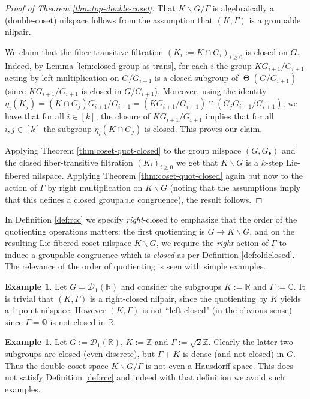 \documentclass[a4paper,12pt,reqno]{amsart}
\theoremstyle{definition}
\newtheorem{example}[theorem]{Example}
\def\to{\rightarrow}
\newcommand{\mc}{\mathcal}
\newcommand{\mb}{\mathbb}
\DeclareMathOperator{\tran}{\Theta}
\begin{document}
\begin{proof}[Proof of Theorem \ref{thm:top-double-coset}]
That $K\backslash G/{\Gamma}$ is algebraically a (double-coset) nilspace follows from the assumption that $(K,\Gamma)$ is a groupable nilpair.

We claim that the fiber-transitive filtration $(K_i:=K\cap G_i)_{i\geq 0}$ is closed on $ G$. Indeed, by Lemma \ref{lem:closed-group-as-trans}, for each $i$ the group 
$KG_{i+1}/G_{i+1}$ acting by left-multiplication on $G/G_{i+1}$ is a closed subgroup of $\tran(G/G_{i+1})$ (since $KG_{i+1}/G_{i+1}$ is closed in $G/G_{i+1}$). Moreover, using the identity $\eta_i(K_j)=(K\cap G_j)G_{i+1}/G_{i+1}= (KG_{i+1}/G_{i+1}) \cap (G_j G_{i+1}/G_{i+1})$, we have that for all $i\in[k]$, the closure of $KG_{i+1}/G_{i+1}$ implies that for all $i,j\in[k]$ the subgroup $\eta_i(K\cap G_j)$ is closed. This proves our claim.

Applying Theorem \ref{thm:coset-quot-closed} to the group nilspace $(G,G_\bullet)$ and the closed fiber-transitive filtration $(K_i)_{i\geq 0}$ we get that $K\backslash G$ is a $k$-step Lie-fibered nilspace. Applying Theorem \ref{thm:coset-quot-closed} again but now to the action of $\Gamma$ by right multiplication on $K\backslash G$ (noting that the assumptions imply that this defines a closed groupable congruence), the result follows.
\end{proof}
\noindent In Definition \ref{def:rcc} we specify \emph{right}-closed to emphasize that the order of the quotienting operations matters: the first quotienting is $G\to K\backslash G$, and on the resulting Lie-fibered coset nilspace $K\backslash G$, we require the \emph{right}-action of $\Gamma$ to induce a groupable congruence which is \emph{closed} as per Definition \ref{def:oldclosed}. The relevance of the order of quotienting is seen with simple examples.
\begin{example}
Let $G=\mc{D}_1(\mb{R})$ and consider the subgroups $K:=\mb{R}$ and $\Gamma:=\mb{Q}$. It is trivial that $(K,\Gamma)$  is a right-closed nilpair, since the quotienting by $K$ yields a 1-point nilspace. However $(K,\Gamma)$ is not ``left-closed" (in the obvious sense) since $\Gamma= \mb{Q}$ is not closed in $\mb{R}$. 
\end{example}

\begin{example}
Let $G:=\mc{D}_1(\mb{R})$, $K:=\mb{Z}$ and ${\Gamma}:=\sqrt{2}\mb{Z}$. Clearly the latter two subgroups are closed (even discrete), but $\Gamma+K$ is dense (and not closed) in $G$. Thus the double-coset space $K\backslash G/ \Gamma$ is not even a Hausdorff space. This does not satisfy Definition \ref{def:rcc} and indeed with that definition we avoid such examples. 
\end{example}
\end{document}
